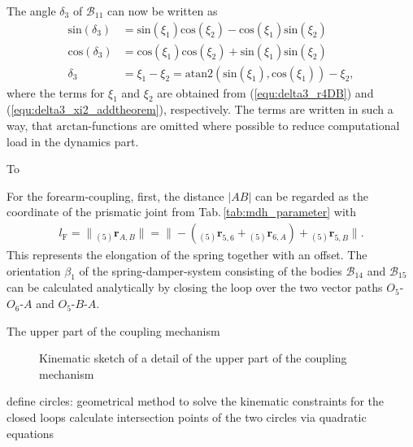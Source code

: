 \documentclass[letterpaper, 10 pt, conference]{ieeeconf}  %
\newcommand{\body}[1]{\mathcal{B}_{#1}}
\newcommand{\ortvek}[3]{{ }_{(#1)}{\boldsymbol{r}}^{#2}_{#3}}
\begin{document}
%
The angle $\delta_3$ of $\body{11}$ can now be written as
%
\begin{align}
\mathrm{sin}(\delta_3) &= \mathrm{sin}(\xi_1)\mathrm{cos}(\xi_2)-\mathrm{cos}(\xi_1)\mathrm{sin}(\xi_2)\\
\mathrm{cos}(\delta_3) &= \mathrm{cos}(\xi_1)\mathrm{cos}(\xi_2)+\mathrm{sin}(\xi_1)\mathrm{sin}(\xi_2)\\
\delta_3 &= \xi_1 - \xi_2 =  \mathrm{atan2}(\mathrm{sin}(\xi_1),\mathrm{cos}(\xi_1)) - \xi_2 ,
\end{align}
%
where the terms for $\xi_1$ and $\xi_2$ are obtained from (\ref{equ:delta3_r4DB}) and (\ref{equ:delta3_xi2_addtheorem}), respectively.
The terms are written in such a way, that $\mathrm{arctan}$-functions are omitted where possible to reduce computational load in the dynamics part.

To 

For the forearm-coupling, first, the distance $|AB|$ can be regarded as the coordinate of the prismatic joint from Tab.\,\ref{tab:mdh_parameter} with
%
\begin{align}
l_\mathrm{F} = \|\ortvek{5}{}{A,B}\| = \|-(\ortvek{5}{}{5,6}+\ortvek{5}{}{6,A}) + \ortvek{5}{}{5,B}\|.
\end{align}
%
This represents the elongation of the spring together with an offset.
The orientation $\beta_1$ of the spring-damper-system consisting of the bodies $\body{14}$ and $\body{15}$ can be calculated analytically by closing the loop over the two vector paths $O_5$-$O_6$-$A$ and $O_5$-$B$-$A$.


The upper part of the coupling mechanism 



%



\begin{figure}[htb]
    \small
    \begin{minipage}[t]{7.5cm}
        \vspace{0.2cm} %
        
    \end{minipage}
    
    \caption{Kinematic sketch of a detail of the upper part of the coupling mechanism}
    \label{fig:KAS5_upper_coupling}
\end{figure}



define circles: geometrical method to solve the kinematic constraints for the closed loops
calculate intersection points of the two circles via quadratic equations 
\end{document}
